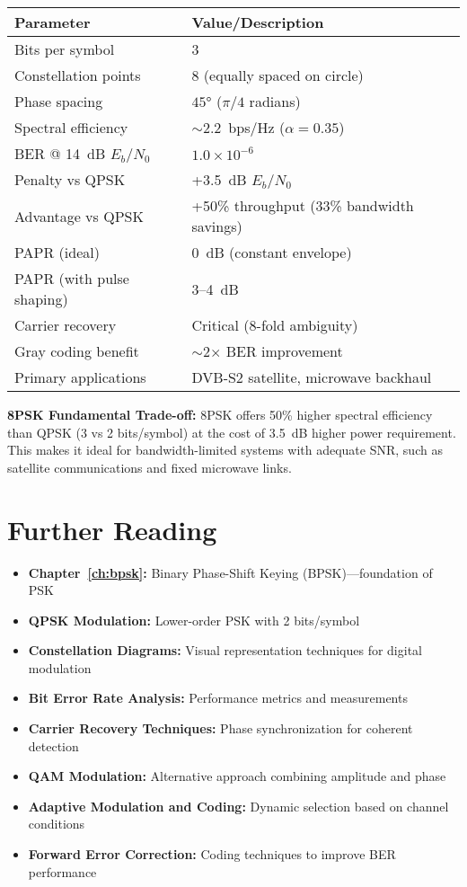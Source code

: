 \begin{center}
\begin{tabular}{@{}ll@{}}
\toprule
\textbf{Parameter} & \textbf{Value/Description} \\
\midrule
Bits per symbol & 3 \\
Constellation points & 8 (equally spaced on circle) \\
Phase spacing & $45°$ ($\pi/4$ radians) \\
Spectral efficiency & $\sim$2.2~bps/Hz ($\alpha = 0.35$) \\
BER @ 14~dB $E_b/N_0$ & $1.0 \times 10^{-6}$ \\
Penalty vs QPSK & +3.5~dB $E_b/N_0$ \\
Advantage vs QPSK & +50\% throughput (33\% bandwidth savings) \\
PAPR (ideal) & 0~dB (constant envelope) \\
PAPR (with pulse shaping) & 3--4~dB \\
Carrier recovery & Critical (8-fold ambiguity) \\
Gray coding benefit & $\sim$2$\times$ BER improvement \\
Primary applications & DVB-S2 satellite, microwave backhaul \\
\bottomrule
\end{tabular}
\end{center}

\begin{keyconcept}
\textbf{8PSK Fundamental Trade-off:} 8PSK offers 50\% higher spectral efficiency than QPSK (3 vs 2 bits/symbol) at the cost of 3.5~dB higher power requirement. This makes it ideal for bandwidth-limited systems with adequate SNR, such as satellite communications and fixed microwave links.
\end{keyconcept}

\section{Further Reading}

\begin{itemize}
\item \textbf{Chapter~\ref{ch:bpsk}:} Binary Phase-Shift Keying (BPSK)---foundation of PSK
\item \textbf{QPSK Modulation:} Lower-order PSK with 2 bits/symbol
\item \textbf{Constellation Diagrams:} Visual representation techniques for digital modulation
\item \textbf{Bit Error Rate Analysis:} Performance metrics and measurements
\item \textbf{Carrier Recovery Techniques:} Phase synchronization for coherent detection
\item \textbf{QAM Modulation:} Alternative approach combining amplitude and phase
\item \textbf{Adaptive Modulation and Coding:} Dynamic selection based on channel conditions
\item \textbf{Forward Error Correction:} Coding techniques to improve BER performance
\end{itemize}
